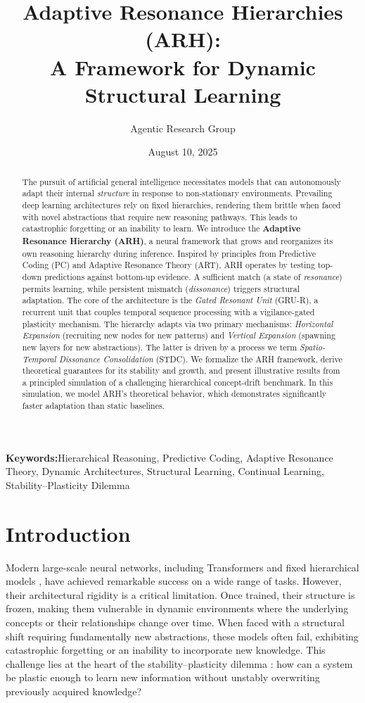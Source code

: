 \documentclass{article}
\title{Adaptive Resonance Hierarchies (ARH): \\ A Framework for Dynamic Structural Learning}
\author{Agentic Research Group}
\date{August 10, 2025}
\newcommand{\keywords}[1]{\par\addvspace\baselineskip\noindent\textbf{Keywords:}\enspace\ignorespaces#1}
\begin{document}
\maketitle

\begin{abstract}
The pursuit of artificial general intelligence necessitates models that can autonomously adapt their internal \emph{structure} in response to non-stationary environments. Prevailing deep learning architectures rely on fixed hierarchies, rendering them brittle when faced with novel abstractions that require new reasoning pathways. This leads to catastrophic forgetting or an inability to learn. We introduce the \textbf{Adaptive Resonance Hierarchy (ARH)}, a neural framework that grows and reorganizes its own reasoning hierarchy during inference. Inspired by principles from Predictive Coding (PC) and Adaptive Resonance Theory (ART), ARH operates by testing top-down predictions against bottom-up evidence. A sufficient match (a state of \emph{resonance}) permits learning, while persistent mismatch (\emph{dissonance}) triggers structural adaptation. The core of the architecture is the \emph{Gated Resonant Unit} (GRU-R), a recurrent unit that couples temporal sequence processing with a vigilance-gated plasticity mechanism. The hierarchy adapts via two primary mechanisms: \emph{Horizontal Expansion} (recruiting new nodes for new patterns) and \emph{Vertical Expansion} (spawning new layers for new abstractions). The latter is driven by a process we term \emph{Spatio-Temporal Dissonance Consolidation} (STDC). We formalize the ARH framework, derive theoretical guarantees for its stability and growth, and present illustrative results from a principled simulation of a challenging hierarchical concept-drift benchmark. In this simulation, we model ARH's theoretical behavior, which demonstrates significantly faster adaptation than static baselines.
\end{abstract}

\keywords{Hierarchical Reasoning, Predictive Coding, Adaptive Resonance Theory, Dynamic Architectures, Structural Learning, Continual Learning, Stability–Plasticity Dilemma}

\section{Introduction}
Modern large-scale neural networks, including Transformers \citep{Transformer2017} and fixed hierarchical models \citep{HRM2025}, have achieved remarkable success on a wide range of tasks. However, their architectural rigidity is a critical limitation. Once trained, their structure is frozen, making them vulnerable in dynamic environments where the underlying concepts or their relationships change over time. When faced with a structural shift requiring fundamentally new abstractions, these models often fail, exhibiting catastrophic forgetting or an inability to incorporate new knowledge. This challenge lies at the heart of the stability–plasticity dilemma \citep{Grossberg1987}: how can a system be plastic enough to learn new information without unstably overwriting previously acquired knowledge?
\end{document}
